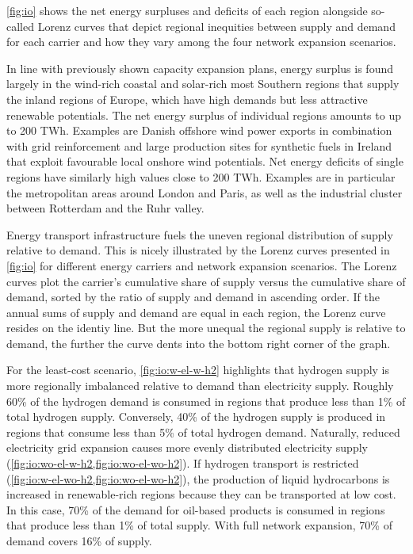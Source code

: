 \cref{fig:io} shows the net energy surpluses and deficits of each region
alongside so-called Lorenz curves that depict regional inequities between supply
and demand for each carrier and how they vary among the four network expansion
scenarios.

In line with previously shown capacity expansion plans, energy surplus is found
largely in the wind-rich coastal and solar-rich most Southern regions that
supply the inland regions of Europe, which have high demands but less attractive
renewable potentials. The net energy surplus of individual regions amounts to up
to 200 TWh. Examples are Danish offshore wind power exports in combination with
grid reinforcement and large production sites for synthetic fuels in Ireland
that exploit favourable local onshore wind potentials. Net energy deficits of
single regions have similarly high values close to 200 TWh. Examples are in
particular the metropolitan areas around London and Paris, as well as the
industrial cluster between Rotterdam and the Ruhr valley.

Energy transport infrastructure fuels the uneven regional distribution of supply
relative to demand. This is nicely illustrated by the Lorenz curves presented in
\cref{fig:io} for different energy carriers and network expansion scenarios. The
Lorenz curves plot the carrier's cumulative share of supply versus the
cumulative share of demand, sorted by the ratio of supply and demand in
ascending order. If the annual sums of supply and demand are equal in each
region, the Lorenz curve resides on the identiy line. But the more unequal the
regional supply is relative to demand, the further the curve dents into the
bottom right corner of the graph.

For the least-cost scenario, \cref{fig:io:w-el-w-h2} highlights that hydrogen
supply is more regionally imbalanced relative to demand than electricity supply.
Roughly 60\% of the hydrogen demand is consumed in regions that produce less
than 1\% of total hydrogen supply. Conversely, 40\% of the hydrogen supply is
produced in regions that consume less than 5\% of total hydrogen demand.
Naturally, reduced electricity grid expansion causes more evenly distributed
electricity supply (\cref{fig:io:wo-el-w-h2,fig:io:wo-el-wo-h2}). If hydrogen
transport is restricted (\cref{fig:io:w-el-wo-h2,fig:io:wo-el-wo-h2}), the
production of liquid hydrocarbons is increased in renewable-rich regions because
they can be transported at low cost. In this case, 70\% of the demand for
oil-based products is consumed in regions that produce less than 1\% of total
supply. With full network expansion, 70\% of demand covers 16\% of supply.

